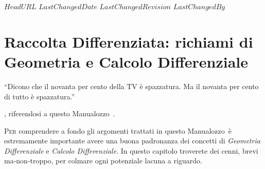 \svnidlong
{$HeadURL$}
{$LastChangedDate$}
{$LastChangedRevision$}
{$LastChangedBy$}

\chapter{Raccolta Differenziata: richiami di Geometria e Calcolo Differenziale}

\begin{introduction}
	``Dicono che il novanta per cento della TV è spazzatura. Ma il novanta per cento di tutto è spazzatura.''
	\begin{flushright}
		, riferendosi a questo Manualozzo\texttrademark\ . 
	\end{flushright}
\end{introduction}

\lettrine[findent=1pt, nindent=0pt]{P}{er} comprendere a fondo gli argomenti trattati in questo Manualozzo\texttrademark\ è estremamente importante avere una buona padronanza dei concetti di \textit{Geometria Differenziale} e \textit{Calcolo Differenziale}. In questo capitolo troverete dei cenni, brevi ma-non-troppo, per colmare ogni potenziale lacuna a riguardo.

